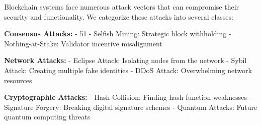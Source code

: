 Blockchain systems face numerous attack vectors that can compromise their security and functionality. We categorize these attacks into several classes:

\textbf{Consensus Attacks:}
- 51%
- Selfish Mining: Strategic block withholding
- Nothing-at-Stake: Validator incentive misalignment

\textbf{Network Attacks:}
- Eclipse Attack: Isolating nodes from the network
- Sybil Attack: Creating multiple fake identities
- DDoS Attack: Overwhelming network resources

\textbf{Cryptographic Attacks:}
- Hash Collision: Finding hash function weaknesses
- Signature Forgery: Breaking digital signature schemes
- Quantum Attacks: Future quantum computing threats